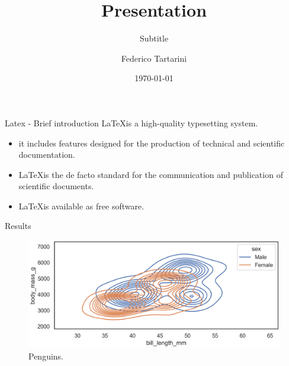 \documentclass{beamer}
\title{Presentation}
\subtitle{Subtitle}
\date{\today}
\author{Federico Tartarini}
\institute{BEARS - Theme A}
\begin{document}
    \maketitle

    \begin{frame}{Latex - Brief introduction}
        \LaTeX is a high-quality typesetting system.
        \begin{itemize}
            \item it includes features designed for the production of technical and scientific documentation.
            \item \LaTeX is the de facto standard for the communication and publication of scientific documents.
            \item \LaTeX is available as free software.
        \end{itemize}
    \end{frame}

    \begin{frame}{Results}
        \centering
        \begin{figure}[]
            \centering
            \includegraphics[width=\linewidth]{figures/penguins_distribution.png}
            \caption{Penguins.}
            \label{fig:penguins}
        \end{figure}
    \end{frame}
\end{document}
